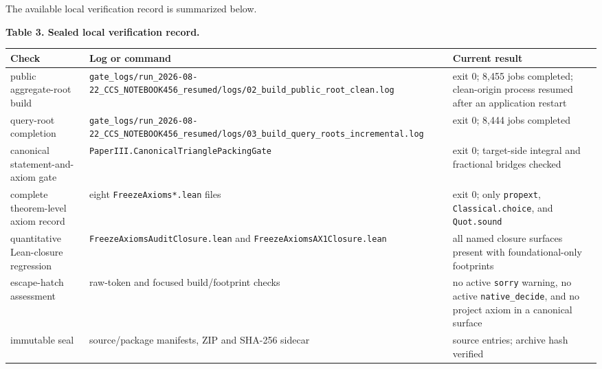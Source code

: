 \documentclass[
  american,
  11pt,
  a4paper,
]{article}
\newcounter{none} %
\begin{document}
The available local verification record is summarized below.

\textbf{Table 3. Sealed local verification record.}

{\def\LTcaptype{none} %
\begin{longtable}[]{@{}
  >{\raggedright\arraybackslash}p{}
  >{\raggedright\arraybackslash}p{}
  >{\raggedright\arraybackslash}p{}@{}}
\toprule\noalign{}
\begin{minipage}[b]{\linewidth}\raggedright
Check
\end{minipage} & \begin{minipage}[b]{\linewidth}\raggedright
Log or command
\end{minipage} & \begin{minipage}[b]{\linewidth}\raggedright
Current result
\end{minipage} \\
\midrule\noalign{}
\endhead
\bottomrule\noalign{}
\endlastfoot
public aggregate-root build & \texttt{gate\_logs/run\_2026-08-22\_CCS\_NOTEBOOK456\_resumed/logs/02\_build\_public\_root\_clean.log} & exit 0; 8,455 jobs completed; clean-origin process resumed after an application restart \\
query-root completion & \texttt{gate\_logs/run\_2026-08-22\_CCS\_NOTEBOOK456\_resumed/logs/03\_build\_query\_roots\_incremental.log} & exit 0; 8,444 jobs completed \\
canonical statement-and-axiom gate & \texttt{PaperIII.CanonicalTrianglePacking\allowbreak{}Gate} & exit 0; target-side integral and fractional bridges checked \\
complete theorem-level axiom record & eight \texttt{FreezeAxioms*.lean} files & exit 0; only \texttt{propext}, \texttt{Classical.choice}, and \texttt{Quot.sound} \\
quantitative Lean-closure regression & \texttt{FreezeAxiomsAuditClosure.lean} and \texttt{FreezeAxiomsAX1Closure.lean} & all named closure surfaces present with foundational-only footprints \\
escape-hatch assessment & raw-token and focused build/footprint checks & no active \texttt{sorry} warning, no active \texttt{native\_decide}, and no project axiom in a canonical surface \\
immutable seal & source/package manifests, ZIP and SHA-256 sidecar & 707 source entries; archive hash verified \\
\end{longtable}
}
\end{document}
